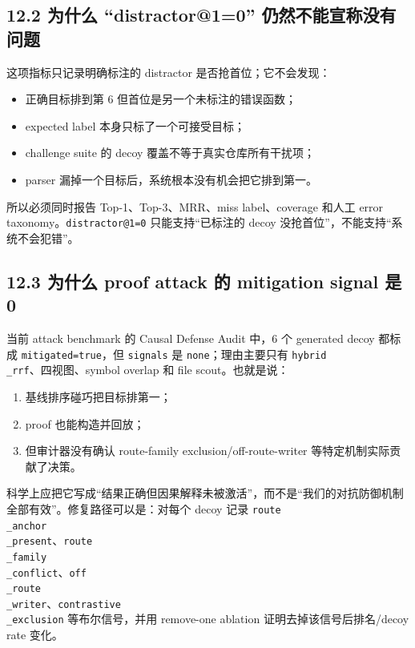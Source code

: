 \documentclass[UTF8,12pt,openany]{ctexbook}
\begin{document}
\subsection{12.2 为什么 “distractor@1=0” 仍然不能宣称没有问题}

这项指标只记录明确标注的 distractor 是否抢首位；它不会发现：\par

\begin{itemize}
\item 正确目标排到第 6 但首位是另一个未标注的错误函数；
\item expected label 本身只标了一个可接受目标；
\item challenge suite 的 decoy 覆盖不等于真实仓库所有干扰项；
\item parser 漏掉一个目标后，系统根本没有机会把它排到第一。
\end{itemize}

所以必须同时报告 Top-1、Top-3、MRR、miss label、coverage 和人工 error taxonomy。\texttt{distractor@1=0} 只能支持“已标注的 decoy 没抢首位”，不能支持“系统不会犯错”。\par

\subsection{12.3 为什么 proof attack 的 mitigation signal 是 0}

当前 attack benchmark 的 Causal Defense Audit 中，6 个 generated decoy 都标成 \texttt{mitigated=true}，但 \texttt{signals} 是 \texttt{none}；理由主要只有 \texttt{hybrid\\_rrf}、四视图、symbol overlap 和 file scout。也就是说：\par

\begin{enumerate}
\item 基线排序碰巧把目标排第一；
\item proof 也能构造并回放；
\item 但审计器没有确认 route-family exclusion/off-route-writer 等特定机制实际贡献了决策。
\end{enumerate}

科学上应把它写成“结果正确但因果解释未被激活”，而不是“我们的对抗防御机制全部有效”。修复路径可以是：对每个 decoy 记录 \texttt{route\\_anchor\\_present}、\texttt{route\\_family\\_conflict}、\texttt{off\\_route\\_writer}、\texttt{contrastive\\_exclusion} 等布尔信号，并用 remove-one ablation 证明去掉该信号后排名/decoy rate 变化。\par
\end{document}
